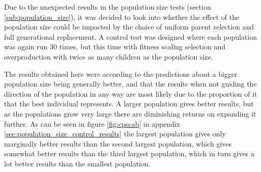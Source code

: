 Due to the unexpected results in the population size tests (section \ref{sub:population_size}), it was decided to look into whether the effect of the population size could be impacted by the choice of uniform parent selection and full generational replacement. A control test was designed where each population was again run 30 times, but this time with fitness scaling selection and overproduction with twice as many children as the population size.

The results obtained here were according to the predictions about a bigger population size being generally better, and that the results when not guiding the direction of the population in any way are most likely due to the proportion of it that the best individual represents. A larger population gives better results, but as the populations grow very large there are diminishing returns on expanding it further. As can be seen in figure \ref{fig:cpscab} in appendix \ref{sec:population_size_control_results} the largest population gives only marginally better results than the second largest population, which gives somewhat better results than the third largest population, which in turn gives a lot better results than the smallest population.




